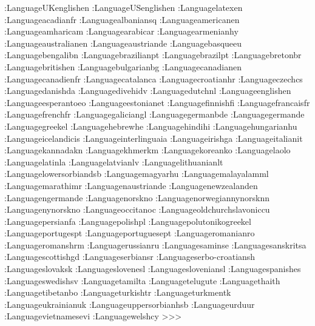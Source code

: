 \Declare:Language{UKenglish}{en}
\Declare:Language{USenglish}{en}
\Declare:Language{latex}{en}
\Declare:Language{acadian}{fr}
\Declare:Language{albanian}{sq}
\Declare:Language{american}{en}
\Declare:Language{amharic}{am}
\Declare:Language{arabic}{ar}
\Declare:Language{armenian}{hy}
\Declare:Language{australian}{en}
\Declare:Language{austrian}{de}
\Declare:Language{basque}{eu}
\Declare:Language{bengali}{bn}
\Declare:Language{brazilian}{pt}
\Declare:Language{brazil}{pt}
\Declare:Language{breton}{br}
\Declare:Language{british}{en}
\Declare:Language{bulgarian}{bg}
\Declare:Language{canadian}{en}
\Declare:Language{canadien}{fr}
\Declare:Language{catalan}{ca}
\Declare:Language{croatian}{hr}
\Declare:Language{czech}{cs}
\Declare:Language{danish}{da}
\Declare:Language{divehi}{dv}
\Declare:Language{dutch}{nl}
\Declare:Language{english}{en}
\Declare:Language{esperanto}{eo}
\Declare:Language{estonian}{et}
\Declare:Language{finnish}{f\/i}
\Declare:Language{francais}{fr}
\Declare:Language{french}{fr}
\Declare:Language{galician}{gl}
\Declare:Language{germanb}{de}
\Declare:Language{german}{de}
\Declare:Language{greek}{el}
\Declare:Language{hebrew}{he}
\Declare:Language{hindi}{hi}
\Declare:Language{hungarian}{hu}
\Declare:Language{icelandic}{is}
\Declare:Language{interlingua}{ia}
\Declare:Language{irish}{ga}
\Declare:Language{italian}{it}
\Declare:Language{kannada}{kn}
\Declare:Language{khmer}{km}
\Declare:Language{korean}{ko}
\Declare:Language{lao}{lo}
\Declare:Language{latin}{la}
\Declare:Language{latvian}{lv}
\Declare:Language{lithuanian}{lt}
\Declare:Language{lowersorbian}{dsb}
\Declare:Language{magyar}{hu}
\Declare:Language{malayalam}{ml}
\Declare:Language{marathi}{mr}
\Declare:Language{naustrian}{de}
\Declare:Language{newzealand}{en}
\Declare:Language{ngerman}{de}
\Declare:Language{norsk}{no}
\Declare:Language{norwegiannynorsk}{nn}
\Declare:Language{nynorsk}{no}
\Declare:Language{occitan}{oc}
\Declare:Language{oldchurchslavonic}{cu}
\Declare:Language{persian}{fa}
\Declare:Language{polish}{pl}
\Declare:Language{polutonikogreek}{el}
\Declare:Language{portuges}{pt}
\Declare:Language{portuguese}{pt}
\Declare:Language{romanian}{ro}
\Declare:Language{romansh}{rm}
\Declare:Language{russian}{ru}
\Declare:Language{samin}{se}
\Declare:Language{sanskrit}{sa}
\Declare:Language{scottish}{gd}
\Declare:Language{serbian}{sr}
\Declare:Language{serbo-croatian}{sh}
\Declare:Language{slovak}{sk}
\Declare:Language{slovene}{sl}
\Declare:Language{slovenian}{sl}
\Declare:Language{spanish}{es}
\Declare:Language{swedish}{sv}
\Declare:Language{tamil}{ta}
\Declare:Language{telugu}{te}
\Declare:Language{thai}{th}
\Declare:Language{tibetan}{bo}
\Declare:Language{turkish}{tr}
\Declare:Language{turkmen}{tk}
\Declare:Language{ukrainian}{uk}
\Declare:Language{uppersorbian}{hsb}
\Declare:Language{urdu}{ur}
\Declare:Language{vietnamese}{vi}
\Declare:Language{welsh}{cy}
>>>


